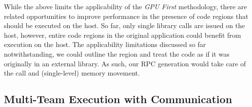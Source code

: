 While the above limits the applicability of the \emph{GPU First} methodology, there are related opportunities to improve performance in the presence of code regions that should be executed on the host.
So far, only single library calls are issued on the host, however, entire code regions in the original application could benefit from execution on the host.
The applicability limitations discussed so far notwithstanding, we could outline the region and treat the code as if it was originally in an external library.
As such, our RPC generation would take care of the call and (single-level) memory movement.


\subsection{Multi-Team Execution with Communication}

